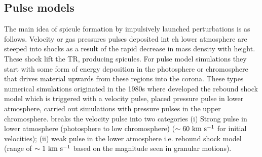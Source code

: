 \documentclass[12pt]{ociamthesis}
\newcommand{\kms}{~\rm{km ~s^{-1}}}
\newcommand{\np}{\\ \\}
\begin{document}
\subsection{Pulse models}
\label{ssec:pulse_model}
The main idea of spicule formation by impulsively launched perturbations is as follows. Velocity or gas pressures pulses deposited int eh lower atmosphere are steeped into shocks as a result of the rapid decrease in mass density with height. These shock lift the TR, producing spicules.
For pulse model simulations they start with some form of energy deposition in the photosphere or chromosphere that drives material upwards from these regions into the corona. These types numerical simulations originated in the 1980s where \cite{Hollweg1982ApJ257345H} developed the rebound shock model which is triggered with a velocity pulse, \cite{Suematsu1982SoPh7599S} placed pressure pulse in lower atmosphere, \cite{Shibata1982} carried out simulations with pressure pulses in the upper chromosphere. \cite{Sterling_2000SoPh} breaks the velocity pulse into two categories (i) Strong pulse in lower atmosphere (photosphere to low chromosphere) ($\sim 60\kms$ for initial velocities); (ii) weak pulse in the lower atmosphere i.e. rebound shock model (range of $\sim 1 \kms$ based on the magnitude seen in granular motions).  \np
%
\end{document}
